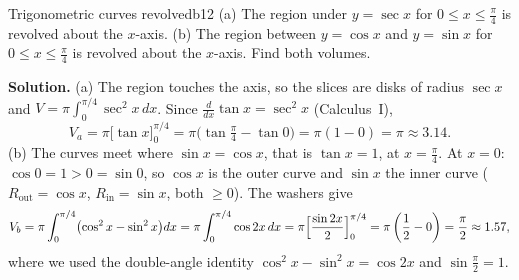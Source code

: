 \documentclass[11pt]{article}
\begin{document}
\begin{exmp}{Trigonometric curves revolved}{b12}
(a) The region under $y=\sec x$ for $0\le x\le\frac\pi4$ is revolved about the $x$-axis. (b) The region between $y=\cos x$ and $y=\sin x$ for $0\le x\le\frac\pi4$ is revolved about the $x$-axis. Find both volumes.

\textbf{Solution.} (a) The region touches the axis, so the slices are disks of radius $\sec x$ and $V=\pi\int_0^{\pi/4}\sec^2x\,dx$. Since $\frac d{dx}\tan x=\sec^2x$ (Calculus~I),
\[
V_a=\pi\bigl[\tan x\bigr]_0^{\pi/4}=\pi\bigl(\tan\tfrac\pi4-\tan0\bigr)=\pi(1-0)=\pi\approx3.14 .
\]
(b) The curves meet where $\sin x=\cos x$, that is $\tan x=1$, at $x=\frac\pi4$. At $x=0$: $\cos0=1>0=\sin0$, so $\cos x$ is the outer curve and $\sin x$ the inner curve ($R_{\mathrm{out}}=\cos x$, $R_{\mathrm{in}}=\sin x$, both $\ge0$). The washers give
\[
V_b=\pi\int_0^{\pi/4}\bigl(\cos^2x-\sin^2x\bigr)dx=\pi\int_0^{\pi/4}\cos2x\,dx=\pi\Bigl[\frac{\sin2x}2\Bigr]_0^{\pi/4}=\pi\left(\frac12-0\right)=\frac\pi2\approx1.57 ,
\]
where we used the double-angle identity $\cos^2x-\sin^2x=\cos2x$ and $\sin\frac\pi2=1$.


\end{exmp}
\end{document}
